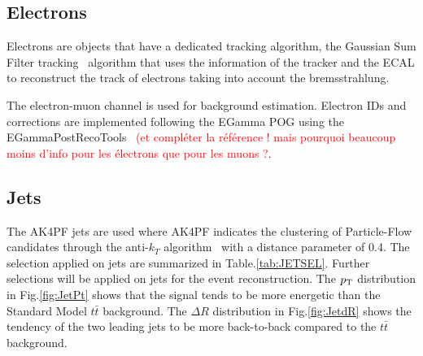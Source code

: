 \documentclass{cernatlasnote}
\newcommand{\pt}{$p_{\text T}$\xspace}
\begin{document}
\begin{appendices}
\subsection{Electrons}
\label{APP: Electrons}
Electrons are objects that have a dedicated tracking algorithm, the Gaussian Sum Filter tracking~\cite{Adam_2005} algorithm that uses the information of the tracker and the ECAL to reconstruct the track of electrons taking into account the bremsstrahlung.

The electron-muon channel is used for background estimation. Electron IDs and corrections are implemented following the EGamma POG using the EGammaPostRecoTools~\textcolor{red}{\cite{EgammaPostRecoTools} (et compléter la référence ! mais pourquoi beaucoup moins d'info pour les électrons que pour les muons ?}.


\subsection{Jets}
\label{APP: Jets}
The AK4PF jets are used where AK4PF indicates the clustering of Particle-Flow candidates through the anti-$k_T$ algorithm~\cite{ANTIKT} with a distance parameter of 0.4. The selection applied on jets are summarized in Table.\ref{tab:JETSEL}. Further selections will be applied on jets for the event reconstruction. The \pt  distribution in Fig.\ref{fig:JetPt} shows that the signal tends to be more energetic than the Standard Model $t\bar{t}$ background. The $\Delta R$   distribution in Fig.\ref{fig:JetdR} shows the tendency of the two leading jets to be more back-to-back compared to the $t\bar{t}$ background.


\end{appendices}
\end{document}
